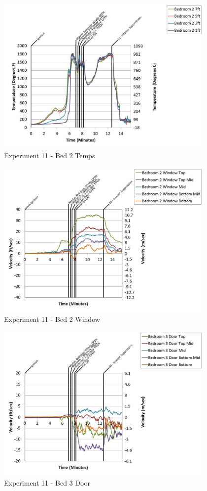 \documentclass{article}
\begin{document}
\begin{appendices}
	\begin{figure}[h!]
		\centering
		\includegraphics[height=3.05in]{0_Images/Results_Charts/Exp_11_Charts/Bed2Temps.pdf}
		\caption{Experiment 11 - Bed 2 Temps}
	\end{figure}
 
	\clearpage

	\begin{figure}[h!]
		\centering
		\includegraphics[height=3.05in]{0_Images/Results_Charts/Exp_11_Charts/Bed2Window.pdf}
		\caption{Experiment 11 - Bed 2 Window}
	\end{figure}
 

	\begin{figure}[h!]
		\centering
		\includegraphics[height=3.05in]{0_Images/Results_Charts/Exp_11_Charts/Bed3Door.pdf}
		\caption{Experiment 11 - Bed 3 Door}
	\end{figure}
 

\end{appendices}
\end{document}
